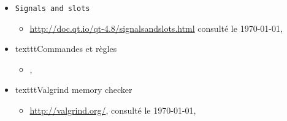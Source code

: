 \documentclass[a4paper,11pt]{report}
\begin{document}
\begin{itemize}
\begin{itemize}
				\url{http://doc.qt.io/qt-4.8/graphicsview.html#classes-in-the-graphics-view-framework}
				consulté le \today, \\
		\end{itemize}
	\item[] \texttt{Signals and slots}
		\begin{itemize}
			\item \url{http://doc.qt.io/qt-4.8/signalsandslots.html} consulté le
				\today, \\
		\end{itemize}
	\item[] texttt{Commandes et règles}
		\begin{itemize}
			\item {},\\
		\end{itemize}
	\item[] texttt{Valgrind memory checker}
		\begin{itemize}
		\item \url{http://valgrind.org/}, consulté le \today, \\
		\end{itemize}
\end{itemize}
\end{document}
